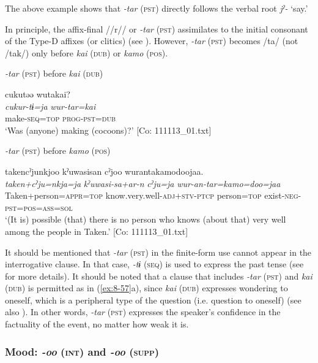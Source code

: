 The above example shows that \textit{-tar} (\textsc{pst}) directly follows the verbal root \textit{jˀ-} ‘say.’

In principle, the affix-final //r// or \textit{-tar} (\textsc{pst}) assimilates to the initial consonant of the Type-D affixes (or clitics) (see ). However, \textit{-tar} (\textsc{pst}) becomes /ta/ (not /tak/) only before \textit{kai} (\textsc{dub}) or \textit{kamo} (\textsc{pos}).

\ea\label{ex:8-57}
\ea \textit{-tar} (\textsc{pst}) before \textit{kai} (\textsc{dub})

  {\TM}
\glll  cukutəə  wutakai?\\
\textit{cukur-tɨ=ja}  \textit{wur-tar=kai}\\
    make-\textsc{seq}=\textsc{top}  \textsc{prog}-\textsc{pst}=\textsc{dub}\\
\glt ‘Was (anyone) making (cocoons)?’ [Co: 111113\_01.txt]


\ex \textit{-tar} (\textsc{pst}) before \textit{kamo} (\textsc{pos})

  {\TM}
\glll  takencˀjunkjoo  kˀuwasisan  cˀjoo    wurantakamodoojaa.\\
\textit{taken+cˀju=nkja=ja}  \textit{kˀuwasi-sa+ar-n}  \textit{cˀju=ja}    \textit{wur-an-tar=kamo=doo=jaa}\\
    Taken+person=\textsc{appr}=\textsc{top}  know.very.well-\textsc{adj}+\textsc{stv}-\textsc{ptcp}  person=\textsc{top}  exist-\textsc{neg}-\textsc{pst}=\textsc{pos}=\textsc{ass}=\textsc{sol}\\
\glt ‘(It is) possible (that) there is no person who knows (about that) very well among the people in Taken.’ [Co: 111113\_01.txt]
\z
\z

  It should be mentioned that \textit{-tar} (\textsc{pst}) in the finite-form use cannot appear in the interrogative clause. In that case, \textit{-tɨ} (\textsc{seq}) is used to express the past tense (see  for more details). It should be noted that a clause that includes \textit{-tar} (\textsc{pst}) and \textit{kai} (\textsc{dub}) is permitted as in (\ref{ex:8-57}a), since \textit{kai} (\textsc{dub}) expresses wondering to oneself, which is a peripheral type of the question (i.e. question to oneself) (see also ). In other words, \textit{-tar} (\textsc{pst}) expresses the speaker’s confidence in the factuality of the event, no matter how weak it is.

\subsubsection{Mood: \textit{-oo} (\textsc{int}) and \textit{-oo} (\textsc{supp})}

